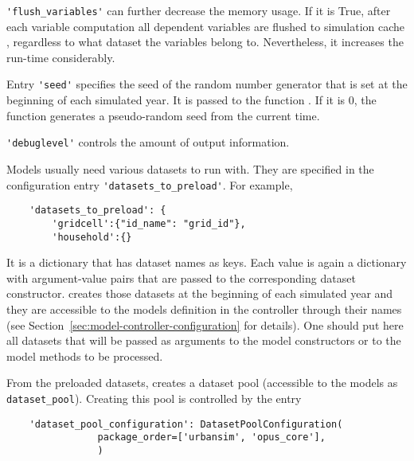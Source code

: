 \verb|'flush_variables'| can further decrease the memory usage.  If it is True, after each variable
computation all dependent variables are flushed to simulation
cache \simulationcacheindex, regardless to what dataset \datasetindex the variables belong to.
Nevertheless, it increases the run-time considerably.

Entry \verb|'seed'| specifies the seed of the random number generator that is set at
the beginning of each simulated year. It is passed to the  \numpyindex
function . If it is 0, the function generates a pseudo-random seed
from the current time.

\verb|'debuglevel'| controls the amount of output information.

Models \modelsindex usually need various datasets \datasetindex to run with. They are specified in the
configuration entry \verb|'datasets_to_preload'|. For example,
\begin{verbatim}
    'datasets_to_preload': {
        'gridcell':{"id_name": "grid_id"},
        'household':{}
\end{verbatim}
It is a dictionary that has dataset \datasetindex names as keys. Each value is again a
dictionary with argument-value pairs that are passed to the corresponding
dataset \datasetindex constructor.  \modelsindex creates those datasets \datasetindex at the
beginning of each simulated year and they are accessible to the models \modelsindex
definition in the controller through their names (see
Section~\ref{sec:model-controller-configuration} for details). One should put
here all datasets \datasetindex that will be passed as arguments to the model constructors
or to the model methods to be processed.

From the preloaded datasets,  creates a dataset pool (accessible
to the models as \verb|dataset_pool|). Creating this pool is controlled by
the entry
\begin{verbatim}
    'dataset_pool_configuration': DatasetPoolConfiguration(
                package_order=['urbansim', 'opus_core'],
                )
\end{verbatim}


